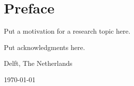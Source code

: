 \chapter*{Preface}

Put a motivation for a research topic here.

\vspace{1\baselineskip}

Put acknowledgments here.

\vspace{1\baselineskip}

\reportAuthor

\vspace{1\baselineskip}

\noindent
Delft, The Netherlands

\noindent
\today